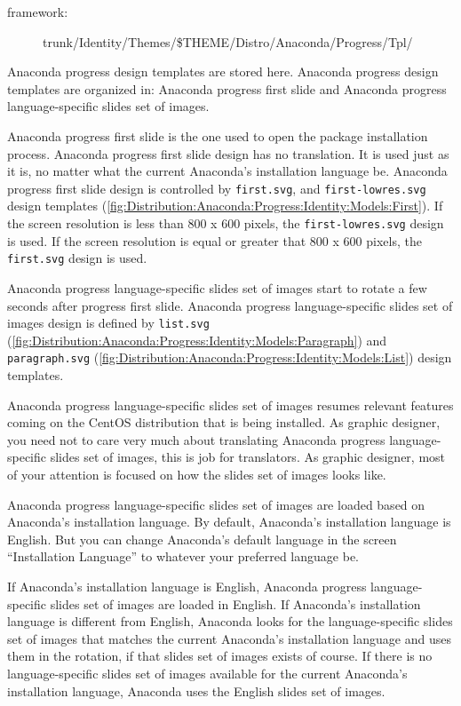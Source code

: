 \begin{description}
\item[framework:] trunk/Identity/Themes/\$THEME/Distro/Anaconda/Progress/Tpl/
\end{description}

\noindent Anaconda progress design templates are stored here.
Anaconda progress design templates are organized in: Anaconda progress
first slide and Anaconda progress language-specific slides set of
images.

Anaconda progress first slide is the one used to open the package
installation process.  Anaconda progress first slide design has no
translation. It is used just as it is, no matter what the current
Anaconda's installation language be.  Anaconda progress first slide
design is controlled by \texttt{first.svg}, and
\texttt{first-lowres.svg} design templates
(\autoref{fig:Distribution:Anaconda:Progress:Identity:Models:First}).
If the screen resolution is less than 800 x 600 pixels, the
\texttt{first-lowres.svg} design is used. If the screen resolution is
equal or greater that 800 x 600 pixels, the \texttt{first.svg} design
is used.

Anaconda progress language-specific slides set of images start to
rotate a few seconds after progress first slide.  Anaconda progress
language-specific slides set of images design is defined by
\texttt{list.svg}
(\autoref{fig:Distribution:Anaconda:Progress:Identity:Models:Paragraph})
and \texttt{paragraph.svg}
(\autoref{fig:Distribution:Anaconda:Progress:Identity:Models:List})
design templates. 

Anaconda progress language-specific slides set of images resumes
relevant features coming on the CentOS distribution that is being
installed.  As graphic designer, you need not to care very much about
translating Anaconda progress language-specific slides set of images,
this is job for translators.  As graphic designer, most of your
attention is focused on how the slides set of images looks like.

Anaconda progress language-specific slides set of images are loaded
based on Anaconda's installation language.  By default, Anaconda's
installation language is English. But you can change Anaconda's
default language in the screen ``Installation Language'' to whatever
your preferred language be. 

If Anaconda's installation language is English, Anaconda progress
language-specific slides set of images are loaded in English.  If
Anaconda's installation language is different from English, Anaconda
looks for the language-specific slides set of images that matches the
current Anaconda's installation language and uses them in the
rotation, if that slides set of images exists of course.  If there is
no language-specific slides set of images available for the current
Anaconda's installation language, Anaconda uses the English slides set
of images.

